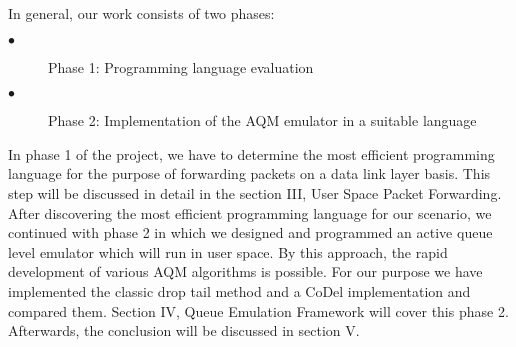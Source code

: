 In general, our work consists of two phases:
\begin{description}
  \item[$\bullet$] Phase 1: Programming language evaluation
  \item[$\bullet$] Phase 2: Implementation of the AQM emulator in a suitable language
\end{description}
In phase 1 of the project, we have to determine the most efficient programming language for the purpose of forwarding packets on a data link layer basis. This step will be discussed in detail in the section III, User Space Packet Forwarding. After discovering the most efficient programming language for our scenario, we continued with phase 2 in which we designed and programmed an active queue level emulator which will run in user space. By this approach, the rapid development of various AQM algorithms is possible. For our purpose we have implemented the classic drop tail method and a CoDel implementation and compared them. Section IV, Queue Emulation Framework will cover this phase 2. Afterwards, the conclusion will be discussed in section V. \newline 


 


